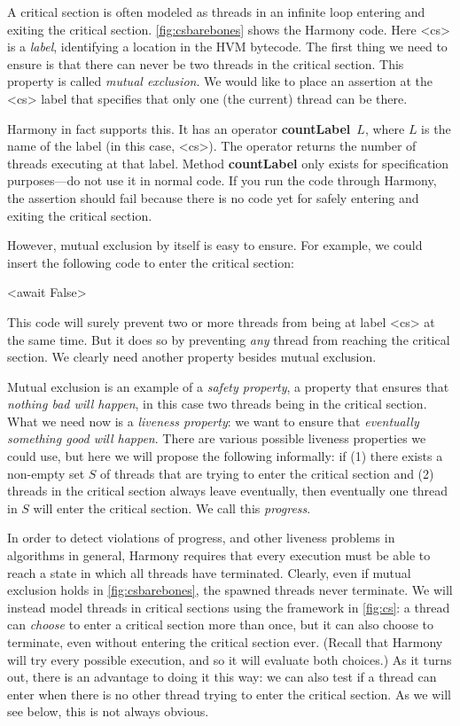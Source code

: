 \documentclass{report}
\newenvironment{code}{
\tcolorbox
}{
\endtcolorbox
}
\begin{document}
%

A critical section is often modeled as threads in an infinite loop
entering and exiting the critical section.
\autoref{fig:csbarebones} shows the Harmony code.
Here <{cs}> is a \emph{label},
%
identifying a location in the HVM bytecode.  The first thing we need to
ensure is that there can never be two threads in the critical section.
This property is called \emph{mutual exclusion}.
%
We would like to place an assertion at the <{cs}> label that
specifies that only one (the current) thread can be there.

Harmony in fact supports this.
It has an operator \textbf{countLabel}~$L$,
%
where $L$ is the name of the label (in this case, <{cs}>).
The operator returns the number of threads executing at that label.
Method \textbf{countLabel} only exists for specification purposes---do not
use it in normal code.
If you run the code through Harmony, the assertion should fail because
there is no code yet for safely entering and exiting the critical section.

However, mutual exclusion by itself is easy to ensure.
For example, we could insert the following code to enter the
critical section:
\begin{code}
<{await False}>
\end{code}
This code will surely prevent two or more threads from being
at label <{cs}> at the same time.
But it does so by preventing \emph{any} thread from reaching
the critical section.
We clearly need another property besides mutual exclusion.

Mutual exclusion is an example of a \emph{safety property},
%
a property that ensures that \emph{nothing bad will happen}, in this case
two threads being in the critical section.
What we need now is a \emph{liveness property}:
%
we want to ensure that
\emph{eventually something good will happen}.
There are various possible liveness properties we could use,
but here we will propose the following informally: if
(1) there exists a non-empty
set $S$ of threads that are trying to enter the critical section and
(2) threads in the critical section always leave eventually, then
eventually one thread in $S$ will enter the critical section.
We call this \emph{progress}.
%

In order to detect violations of progress, and other liveness problems in
algorithms in general, Harmony requires that every execution must be
able to reach a state in which all threads have terminated.
Clearly, even if mutual exclusion holds in \autoref{fig:csbarebones},
the spawned threads never terminate.  We
will instead model threads in critical sections using the framework in
\autoref{fig:cs}: a thread can \emph{choose} to enter a
critical section more than once, but it can also choose to terminate, even
without entering the critical section ever.
(Recall that Harmony will try every possible execution, and so it will evaluate
both choices.)
As it turns out, there is an advantage to doing it this way: we can also
test if a thread can enter when there is no other thread trying to enter
the critical section.  As we will see below, this is not always obvious.
\end{document}
